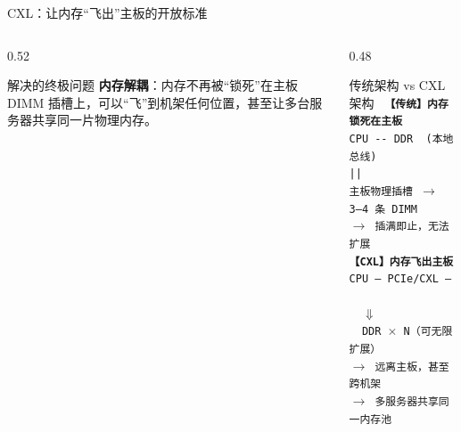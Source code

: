 \documentclass[aspectratio=169, 8pt, UTF8]{ctexbeamer}
\begin{document}
\begin{frame}{CXL：让内存``飞出''主板的开放标准}
\begin{columns}[T]
\begin{column}{0.52\textwidth}
      \begin{exampleblock}{解决的终极问题}
        \textbf{内存解耦}：内存不再被``锁死''在主板 DIMM 插槽上，可以``飞''到机架任何位置，甚至让多台服务器共享同一片物理内存。
      \end{exampleblock}
    \end{column}
    \begin{column}{0.48\textwidth}
      \centering
      \begin{block}{传统架构 vs CXL 架构}
        \vspace{4pt}
        \texttt{%
        \textbf{【传统】内存锁死在主板}\\[4pt]
        \quad CPU\ \textbullet\!\!-\!\!\textbullet\!\!-\!\!\textbullet\ DDR\ \ (本地总线)\\[2pt]
        \quad |\qquad\qquad\qquad\qquad|\\[2pt]
        \quad 主板物理插槽 $\to$ 3--4 条 DIMM\\[2pt]
        \quad $\to$ 插满即止，无法扩展\\[10pt]
        \textbf{【CXL】内存飞出主板}\\[4pt]
        \quad CPU\ ---\ PCIe/CXL\ ---\ \\[2pt]
        \qquad\qquad\qquad\qquad\qquad\ \  $\Downarrow$\\[2pt]
        \qquad\qquad\qquad\qquad\ \  DDR $\times$ N（可无限扩展）\\[2pt]
        \quad $\to$ 远离主板，甚至跨机架\\[2pt]
        \quad $\to$ 多服务器共享同一内存池%
        }
      \end{block}
    \end{column}
  \end{columns}
\end{frame}
\end{document}
